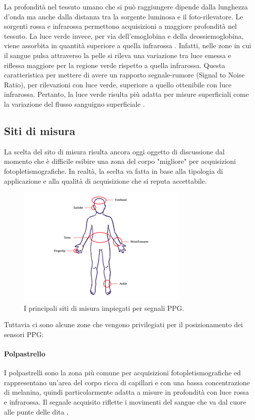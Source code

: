 La profondità nel tessuto umano che si può raggiungere dipende dalla lunghezza d'onda ma anche dalla distanza tra la sorgente luminosa e il foto-rilevatore. Le sorgenti rossa e infrarossa permettono acquisizioni a maggiore profondità nel tessuto. La luce verde invece, per via dell'emoglobina e della deossiemoglobina, viene assorbita in quantità superiore a quella infrarossa \cite{Lee2021}. Infatti, nelle zone in cui il sangue pulsa attraverso la pelle si rileva una variazione tra luce emessa e riflessa maggiore per la regione verde rispetto a quella infrarossa. Questa caratteristica per mettere di avere un rapporto segnale-rumore (Signal to Noise Ratio), per rilevazioni con luce verde, superiore a quello ottenibile con luce infrarossa. Pertanto, la luce verde risulta più adatta per misure superficiali come la variazione del flusso sanguigno superficiale \cite{Youssef2020}.
\subsection{Siti di misura}
La scelta del sito di misura risulta ancora oggi oggetto di discussione dal momento che è difficile esibire una zona del corpo "migliore" per acquisizioni fotopletismografiche. In realtà, la scelta va fatta in base alla tipologia di applicazione e alla qualità di acquisizione che si reputa accettabile.
\begin{figure}[h]
	\centering
	\includegraphics[width=0.7\linewidth]{ImageFiles/Fotopletismografia/ZoneAcquisizione}
	\caption{I principali siti di misura impiegati per segnali PPG.}
	\label{fig:ZoneAcquisizione}
\end{figure}
Tuttavia ci sono alcune zone che vengono privilegiati per il posizionamento dei sensori PPG:
	\paragraph{Polpastrello}
	 I polpastrelli sono la zona più comune per acquisizioni fotopletismografiche ed rappresentano un'area del corpo ricca di capillari e con una bassa concentrazione di melanina, quindi particolarmente adatta a misure in profondità con luce rossa e infrarossa. Il segnale acquisito riflette i movimenti del sangue che va dal cuore alle punte delle dita \cite{Elgendi2012}.
